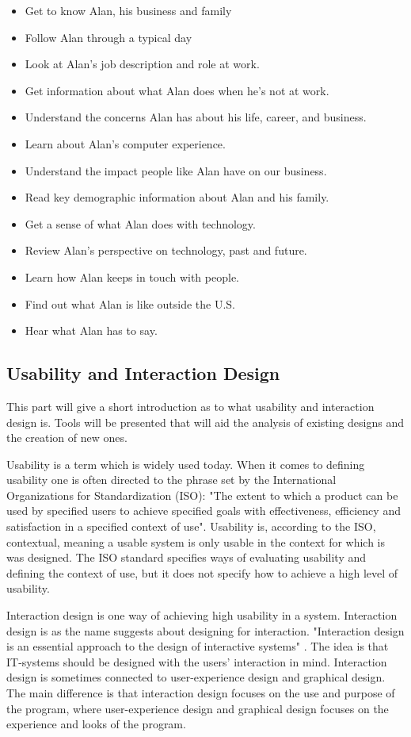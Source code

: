 \begin {itemize}
\item Get to know Alan, his business and family
\item Follow Alan through a typical day
\item Look at Alan's job description and role at work.
\item Get information about what Alan does when he’s not at work.
\item Understand the concerns Alan has about his life, career, and business.
\item Learn about Alan’s computer experience.
\item Understand the impact people like Alan have on our business.
\item Read key demographic information about Alan and his family.
\item Get a sense of what Alan does with technology.
\item Review Alan’s perspective on technology, past and future.
\item Learn how Alan keeps in touch with people.
\item Find out what Alan is like outside the U.S.
\item Hear what Alan has to say.
\end {itemize}

\subsection {Usability and Interaction Design}
This part will give a short introduction as to what usability and interaction design is. Tools will be presented that will aid the analysis of existing designs and the creation of new ones.

Usability is a term which is widely used today. When it comes to defining usability one is often directed to the phrase set by the International Organizations for Standardization (ISO): "The extent to which a product can be used by specified users to achieve specified goals with effectiveness, efficiency and satisfaction in a specified context of use".\cite{iso9241} Usability is, according to the ISO, contextual, meaning a usable system is only usable in the context for which is was designed. The ISO standard specifies ways of evaluating usability and defining the context of use, but it does not specify how to achieve a high level of usability.

Interaction design is one way of achieving high usability in a system. Interaction design is as the name suggests about designing for interaction. "Interaction design is an essential approach to the design of interactive systems" \cite{tinauli}. The idea is that IT-systems should be designed with the users' interaction in mind. Interaction design is sometimes connected to user-experience design and graphical design. The main difference is that interaction design focuses on the use and purpose of the program, where user-experience design and graphical design focuses on the experience and looks of the program.

